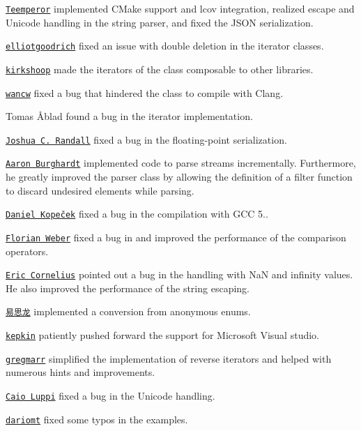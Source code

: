 \begin{DoxyItemize}
\item \href{https://github.com/Teemperor}{\tt Teemperor} implemented C\+Make support and lcov integration, realized escape and Unicode handling in the string parser, and fixed the J\+S\+ON serialization.
\item \href{https://github.com/elliotgoodrich}{\tt elliotgoodrich} fixed an issue with double deletion in the iterator classes.
\item \href{https://github.com/kirkshoop}{\tt kirkshoop} made the iterators of the class composable to other libraries.
\item \href{https://github.com/wanwc}{\tt wancw} fixed a bug that hindered the class to compile with Clang.
\item Tomas Åblad found a bug in the iterator implementation.
\item \href{https://github.com/jrandall}{\tt Joshua C. Randall} fixed a bug in the floating-\/point serialization.
\item \href{https://github.com/aburgh}{\tt Aaron Burghardt} implemented code to parse streams incrementally. Furthermore, he greatly improved the parser class by allowing the definition of a filter function to discard undesired elements while parsing.
\item \href{https://github.com/dkopecek}{\tt Daniel Kopeček} fixed a bug in the compilation with G\+CC 5..
\item \href{https://github.com/Florianjw}{\tt Florian Weber} fixed a bug in and improved the performance of the comparison operators.
\item \href{https://github.com/EricMCornelius}{\tt Eric Cornelius} pointed out a bug in the handling with NaN and infinity values. He also improved the performance of the string escaping.
\item \href{https://github.com/likebeta}{\tt 易思龙} implemented a conversion from anonymous enums.
\item \href{https://github.com/kepkin}{\tt kepkin} patiently pushed forward the support for Microsoft Visual studio.
\item \href{https://github.com/gregmarr}{\tt gregmarr} simplified the implementation of reverse iterators and helped with numerous hints and improvements.
\item \href{https://github.com/caiovlp}{\tt Caio Luppi} fixed a bug in the Unicode handling.
\item \href{https://github.com/dariomt}{\tt dariomt} fixed some typos in the examples.

\end{DoxyItemize}
